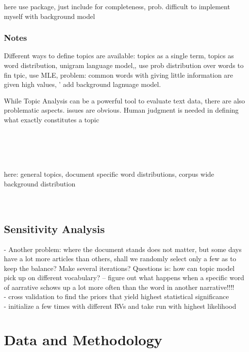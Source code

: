 \documentclass[11pt,a4paper,english,oneside]{book}
\numberwithin{equation}{chapter}
\begin{document}
here use package, just include for completeness, prob. difficult to implement myself with background model




\subsection{Notes}


Different ways to define topics are available: topics as a single term, topics as word distribution,
unigram language model,, use prob distribution over words to fin tpic, use MLE, problem: common words with giving little information are given high values, ' add background lagnuage model.  

While Topic Analysis can be a powerful tool to evaluate text data, there are also problematic aspects. issues are obvious. Human judgment is needed in defining what exactly constitutes a topic

\cite{Hoffman2010} \\
\cite{Steyvers(2007)}\\
\cite{Blei.2003}\\
\cite{Asuncion.2009}\\
here:  general topics, document specific word distributions, corpus wide background distribution \cite{Chem.2007}\\
\cite{Bishop.2006}\\
\cite{Darling.2011}\\




\section{Sensitivity Analysis}

- Another problem: where the document stands does not matter, but some days have a lot more articles than others, shall we randomly select only a few as to keep the balance? Make several iterations? Questions is: how can topic model pick up on different vocabulary? -- figure out what happens when a specific word of aarrative schows up a lot more often than the word in another narrative!!!!\\
- cross validation to find the priors that yield highest statistical significance\\
- initialize a few times with different RVs and take run with highest likelihood


\chapter{Data and Methodology}
\end{document}
